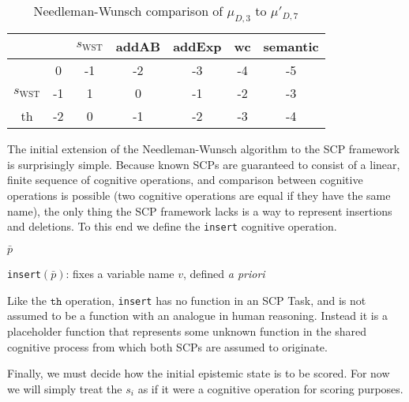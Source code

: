 \begin{table}
\begin{center}
\begin{tabular}{c | c c c c c c }
 & & $s_\text{WST}$ & addAB & addExp & wc & semantic\\
\hline
 & 0 & -1 & -2 & -3 & -4 & -5\\
$s_\text{WST}$ & -1 & 1 & 0 & -1 & -2 & -3\\
th & -2 & 0 & -1 & -2 & -3 & -4
\end{tabular}
\caption{Needleman-Wunsch comparison of $\mu_{D,3}$ to $\mu'_{D,7}$}
\label{tbl:compD3D7prime}
\end{center}
\end{table}

The initial extension of the Needleman-Wunsch algorithm to the SCP framework is surprisingly simple. Because known SCPs are guaranteed to consist of a linear, finite sequence of cognitive operations, and comparison between cognitive operations is possible (two cognitive operations are equal if they have the same name), the only thing the SCP framework lacks is a way to represent insertions and deletions. To this end we define the \texttt{insert} cognitive operation. 

\begin{algorithm}[H] \label{cogOp:insert}
\SetAlgoLined
{}
{
\Return $\bar{p}$
}

\caption{\texttt{insert}$(\bar{p})$: fixes a variable name $v$, defined \textit{a priori}}
\end{algorithm}

Like the $\texttt{th}$ operation, \texttt{insert} has no function in an SCP Task, and is not assumed to be a function with an analogue in human reasoning. Instead it is a placeholder function that represents some unknown function in the shared cognitive process from which both SCPs are assumed to originate.

Finally, we must decide how the initial epistemic state is to be scored. For now we will simply treat the $s_i$ as if it were a cognitive operation for scoring purposes.

